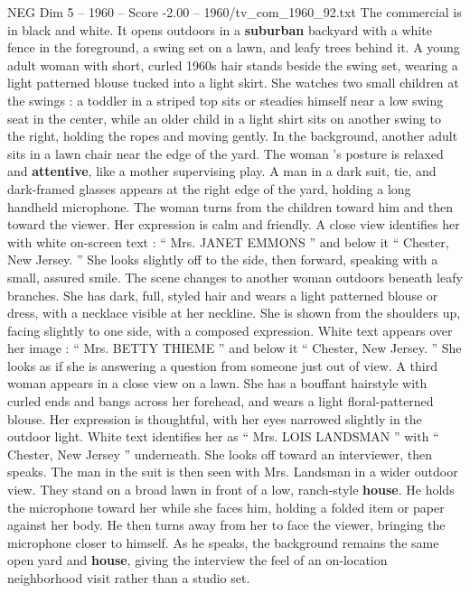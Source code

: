 \begin{textsample}{NEG Dim 5 – 1960 – Score -2.00 – 1960/tv\_com\_1960\_92.txt}  \label{ex:f5_neg_043}
The commercial is in black and white.
It opens outdoors in a \textbf{suburban} backyard with a white fence in the foreground, a swing set on a lawn, and leafy trees behind it.
A young adult woman with short, curled 1960s hair stands beside the swing set, wearing a light patterned blouse tucked into a light skirt.
She watches two small children at the swings : a toddler in a striped top sits or steadies himself near a low swing seat in the center, while an older child in a light shirt sits on another swing to the right, holding the ropes and moving gently.
In the background, another adult sits in a lawn chair near the edge of the yard.
The woman ’s posture is relaxed and \textbf{attentive}, like a mother supervising play.
A man in a dark suit, tie, and dark-framed glasses appears at the right edge of the yard, holding a long handheld microphone.
The woman turns from the children toward him and then toward the viewer.
Her expression is calm and friendly.
A close view identifies her with white on-screen text : “ Mrs.
JANET EMMONS ” and below it “ Chester, New Jersey. ” She looks slightly off to the side, then forward, speaking with a small, assured smile.
The scene changes to another woman outdoors beneath leafy branches.
She has dark, full, styled hair and wears a light patterned blouse or dress, with a necklace visible at her neckline.
She is shown from the shoulders up, facing slightly to one side, with a composed expression.
White text appears over her image : “ Mrs.
BETTY THIEME ” and below it “ Chester, New Jersey. ” She looks as if she is answering a question from someone just out of view.
A third woman appears in a close view on a lawn.
She has a bouffant hairstyle with curled ends and bangs across her forehead, and wears a light floral-patterned blouse.
Her expression is thoughtful, with her eyes narrowed slightly in the outdoor light.
White text identifies her as “ Mrs.
LOIS LANDSMAN ” with “ Chester, New Jersey ” underneath.
She looks off toward an interviewer, then speaks.
The man in the suit is then seen with Mrs.
Landsman in a wider outdoor view.
They stand on a broad lawn in front of a low, ranch-style \textbf{house}.
He holds the microphone toward her while she faces him, holding a folded item or paper against her body.
He then turns away from her to face the viewer, bringing the microphone closer to himself.
As he speaks, the background remains the same open yard and \textbf{house}, giving the interview the feel of an on-location neighborhood visit rather than a studio set.

\end{textsample}
